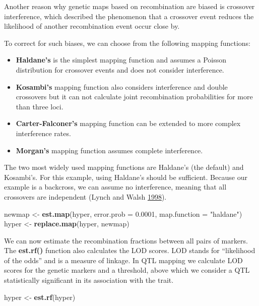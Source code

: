 \documentclass[12pt,]{book}
\newenvironment{Shaded}{\begin{snugshade}}{\end{snugshade}}
\newcommand{\KeywordTok}[1]{\textcolor[rgb]{0.13,0.29,0.53}{\textbf{{#1}}}}
\newcommand{\DataTypeTok}[1]{\textcolor[rgb]{0.13,0.29,0.53}{{#1}}}
\newcommand{\FloatTok}[1]{\textcolor[rgb]{0.00,0.00,0.81}{{#1}}}
\newcommand{\StringTok}[1]{\textcolor[rgb]{0.31,0.60,0.02}{{#1}}}
\newcommand{\NormalTok}[1]{{#1}}
\providecommand{\tightlist}{%
  \setlength{\itemsep}{0pt}\setlength{\parskip}{0pt}}
\theoremstyle{definition}
\theoremstyle{definition}
\theoremstyle{remark}
\begin{document}
Another reason why genetic maps based on recombination are biased is
crossover interference, which described the phenomenon that a crossover
event reduces the likelihood of another recombination event occur close
by.

To correct for such biases, we can choose from the following mapping
functions:

\begin{itemize}
\tightlist
\item
  \textbf{Haldane's} is the simplest mapping function and assumes a
  Poisson distribution for crossover events and does not consider
  interference.
\item
  \textbf{Kosambi's} mapping function also considers interference and
  double crossovers but it can not calculate joint recombination
  probabilities for more than three loci.
\item
  \textbf{Carter-Falconer's} mapping function can be extended to more
  complex interference rates.
\item
  \textbf{Morgan's} mapping function assumes complete interference.
\end{itemize}

The two most widely used mapping functions are Haldane's (the default)
and Kosambi's. For this example, using Haldane's should be sufficient.
Because our example is a backcross, we can assume no interference,
meaning that all crossovers are independent (Lynch and Walsh
\protect\hyperlink{ref-lynch1998genetics}{1998}).

\begin{Shaded}
\begin{Highlighting}[]
\NormalTok{newmap <-}\StringTok{ }\KeywordTok{est.map}\NormalTok{(hyper, }\DataTypeTok{error.prob =} \FloatTok{0.0001}\NormalTok{, }\DataTypeTok{map.function =} \StringTok{"haldane"}\NormalTok{)}
\NormalTok{hyper <-}\StringTok{ }\KeywordTok{replace.map}\NormalTok{(hyper, newmap)}
\end{Highlighting}
\end{Shaded}

We can now estimate the recombination fractions between all pairs of
markers. The \textbf{est.rf()} function also calculates the LOD scores.
LOD stands for ``likelihood of the odds'' and is a measure of linkage.
In QTL mapping we calculate LOD scores for the genetic markers and a
threshold, above which we consider a QTL statistically significant in
its association with the trait.

\begin{Shaded}
\begin{Highlighting}[]
\NormalTok{hyper <-}\StringTok{ }\KeywordTok{est.rf}\NormalTok{(hyper)}
\end{Highlighting}
\end{Shaded}
\end{document}
